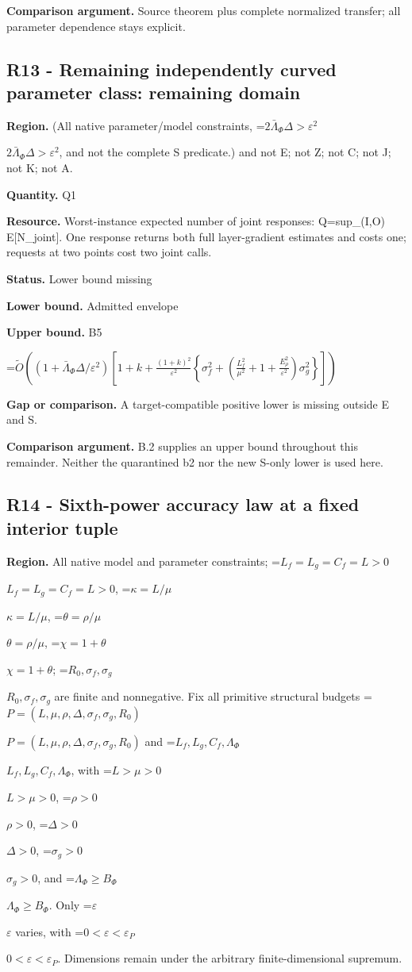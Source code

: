\documentclass[10pt,a4paper]{article}
\newcommand{\AtlasMath}[1]{\par\begingroup\centering\setbox0=\hbox{$\displaystyle #1$}\ifdim\wd0>1.4\linewidth\typeout{ATLAS WIDE FORMULA: \the\wd0}\fi\ifdim\wd0>\linewidth\resizebox{\linewidth}{!}{\box0}\else\box0\fi\par\endgroup}
\newcommand{\AtlasInlineMath}[1]{\begingroup\setbox0=\hbox{$#1$}\ifdim\wd0>.4\linewidth\endgroup\AtlasMath{#1}\else\endgroup$#1$\fi}
\begin{document}
\textbf{Comparison argument.} Source theorem plus complete normalized transfer; all parameter dependence stays explicit.



\subsection{R13 - Remaining independently curved parameter class: remaining domain}


\textbf{Region.} (All native parameter/model constraints, \AtlasInlineMath{2\bar\Lambda_\Phi\Delta>\varepsilon^2}, and not the complete S predicate.) and not E; not Z; not C; not J; not K; not A.



\textbf{Quantity.} Q1



\textbf{Resource.} Worst-instance expected number of joint responses: Q=sup\_(I,O) E[N\_joint]. One response returns both full layer-gradient estimates and costs one; requests at two points cost two joint calls.



\textbf{Status.} Lower bound missing



\textbf{Lower bound.} Admitted envelope



\textbf{Upper bound.} B5



\AtlasMath{\widetilde O\!\left((1+\bar\Lambda_\Phi\Delta/\varepsilon^2)\left[1+k+\frac{(1+k)^2}{\varepsilon^2}\left\{\sigma_f^2+\left(\frac{L_f^2}{\mu^2}+1+\frac{E_\rho^2}{\varepsilon^2}\right)\sigma_g^2\right\}\right]\right)}


\textbf{Gap or comparison.} A target-compatible positive lower is missing outside E and S.



\textbf{Comparison argument.} B.2 supplies an upper bound throughout this remainder. Neither the quarantined b2 nor the new S-only lower is used here.



\subsection{R14 - Sixth-power accuracy law at a fixed interior tuple}


\textbf{Region.} All native model and parameter constraints; \AtlasInlineMath{L_f=L_g=C_f=L>0}, \AtlasInlineMath{\kappa=L/\mu}, \AtlasInlineMath{\theta=\rho/\mu}, \AtlasInlineMath{\chi=1+\theta}; \AtlasInlineMath{R_0,\sigma_f,\sigma_g} are finite and nonnegative. Fix all primitive structural budgets \AtlasInlineMath{P=(L,\mu,\rho,\Delta,\sigma_f,\sigma_g,R_0)} and \AtlasInlineMath{L_f,L_g,C_f,\Lambda_\Phi}, with \AtlasInlineMath{L>\mu>0}, \AtlasInlineMath{\rho>0}, \AtlasInlineMath{\Delta>0}, \AtlasInlineMath{\sigma_g>0}, and \AtlasInlineMath{\Lambda_\Phi\ge B_\Phi}. Only \AtlasInlineMath{\varepsilon} varies, with \AtlasInlineMath{0<\varepsilon<\varepsilon_P}. Dimensions remain under the arbitrary finite-dimensional supremum.
\end{document}
